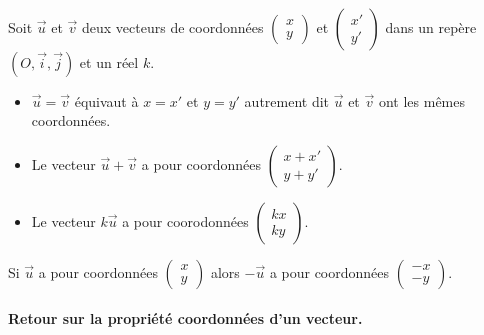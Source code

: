 \begin{Propriété} $ $ \\
Soit $\overrightarrow{u}$ et $\overrightarrow{v}$ deux vecteurs de coordonnées $\begin{pmatrix} 
x \\
y
 \end{pmatrix}$ et  $\begin{pmatrix} 
x' \\
y'
 \end{pmatrix}$ dans un repère $(O,\overrightarrow{i},\overrightarrow{j})$ et un réel $k$.
\begin{itemize}[label=\textcolor{Couleur2}{$\bullet$}]

 \item $\overrightarrow{u}=\overrightarrow{v}$ équivaut à $x=x'$ et $y=y'$ autrement dit  $\overrightarrow{u}$ et $\overrightarrow{v}$ ont les mêmes coordonnées.
 \item Le vecteur $\overrightarrow{u}+\overrightarrow{v}$ a pour coordonnées $\begin{pmatrix} 
x+x' \\
y+y'
 \end{pmatrix}$.
 \item Le vecteur $k\overrightarrow{u}$ a pour coorodonnées $\begin{pmatrix} 
kx \\
ky
 \end{pmatrix}$.
 \end{itemize}

\end{Propriété}


\begin{Remarque}
Si $\overrightarrow{u}$ a pour coordonnées $\begin{pmatrix} 
x \\
y
 \end{pmatrix}$ alors $-\overrightarrow{u}$ a pour coordonnées $\begin{pmatrix} 
-x \\
-y
 \end{pmatrix}$.

\end{Remarque}

\paragraph{Retour sur la propriété coordonnées d'un vecteur.}


